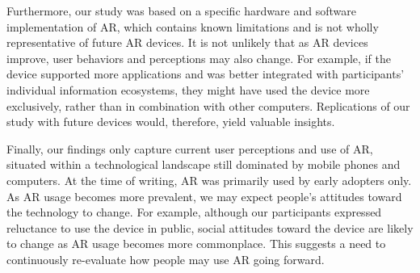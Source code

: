 Furthermore, 
our study was based on a specific hardware and software implementation of AR, which contains known limitations and is not wholly representative of future AR devices. 
It is not unlikely that as AR devices improve, user behaviors and perceptions may also change. 
For example, if the device supported more applications and was better integrated with participants' individual information ecosystems, they might have used the device more exclusively, rather than in combination with other computers.
Replications of our study with future devices would, therefore, yield valuable insights. 

Finally, our findings only capture current user perceptions and use of AR, situated within a technological landscape still dominated by mobile phones and computers. 
At the time of writing, AR was primarily used by early adopters only.
As AR usage becomes more prevalent, we may expect people's attitudes toward the technology to change. 
For example, although our participants expressed reluctance to use the device in public, social attitudes toward the device are likely to change as AR usage becomes more commonplace.
This suggests a need to continuously re-evaluate how people may use AR going forward. 

